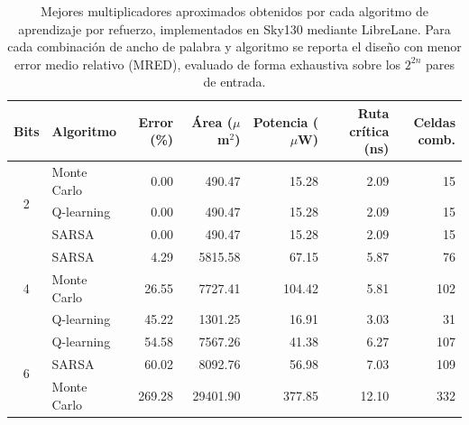 \begin{table}[htbp]
\centering
\caption{Mejores multiplicadores aproximados obtenidos por cada algoritmo de
aprendizaje por refuerzo, implementados en Sky130 mediante LibreLane. Para cada
combinación de ancho de palabra y algoritmo se reporta el diseño con menor error
medio relativo (MRED), evaluado de forma exhaustiva sobre los $2^{2n}$ pares de
entrada.}
\label{tab:metricas}
\begin{tabular}{@{}clrrrrr@{}}
\toprule
\textbf{Bits} & \textbf{Algoritmo} & \textbf{Error (\%)} & \textbf{Área ($\mu$m$^{2}$)} & \textbf{Potencia ($\mu$W)} & \textbf{Ruta crítica (ns)} & \textbf{Celdas comb.} \\
\midrule
\multirow{3}{*}{2} & Monte Carlo & 0.00 & 490.47 & 15.28 & 2.09 & 15 \\
 & Q-learning & 0.00 & 490.47 & 15.28 & 2.09 & 15 \\
 & SARSA & 0.00 & 490.47 & 15.28 & 2.09 & 15 \\
\midrule
\multirow{3}{*}{4} & SARSA & 4.29 & 5815.58 & 67.15 & 5.87 & 76 \\
 & Monte Carlo & 26.55 & 7727.41 & 104.42 & 5.81 & 102 \\
 & Q-learning & 45.22 & 1301.25 & 16.91 & 3.03 & 31 \\
\midrule
\multirow{3}{*}{6} & Q-learning & 54.58 & 7567.26 & 41.38 & 6.27 & 107 \\
 & SARSA & 60.02 & 8092.76 & 56.98 & 7.03 & 109 \\
 & Monte Carlo & 269.28 & 29401.90 & 377.85 & 12.10 & 332 \\
\bottomrule
\end{tabular}
\end{table}
